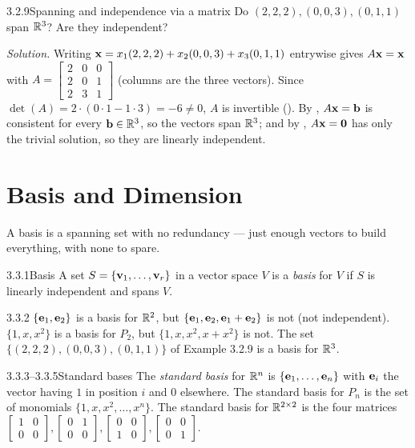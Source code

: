 \begin{exmp}{3.2.9}{Spanning and independence via a matrix}
Do $(2,2,2),(0,0,3),(0,1,1)$ span $\mathbb{R}^3$? Are they independent?

\smallskip
\noindent\textit{Solution.} Writing $\mathbf{x}=x_1(2,2,2)+x_2(0,0,3)+x_3(0,1,1)$ entrywise gives $A\mathbf{x}=\mathbf{x}$ with $A=\left[\begin{smallmatrix}2&0&0\\2&0&1\\2&3&1\end{smallmatrix}\right]$ (columns are the three vectors). Since $\det(A)=2\cdot(0\cdot1-1\cdot3)=-6\neq0$, $A$ is invertible (). By , $A\mathbf{x}=\mathbf{b}$ is consistent for every $\mathbf{b}\in\mathbb{R}^3$, so the vectors span $\mathbb{R}^3$; and by , $A\mathbf{x}=\mathbf{0}$ has only the trivial solution, so they are linearly independent.
\end{exmp}

\section{Basis and Dimension}
\label{sec:3.3}

A basis is a spanning set with no redundancy --- just enough vectors to build everything, with none to spare.

\begin{defns}{3.3.1}{Basis}
A set $S=\{\mathbf{v}_1,\dots,\mathbf{v}_r\}$ in a vector space $V$ is a \emph{basis} for $V$ if $S$ is linearly independent and spans $V$.
\end{defns}

\begin{exmp}{3.3.2}{}
$\{\mathbf{e}_1,\mathbf{e}_2\}$ is a basis for $\mathbb{R}^2$, but $\{\mathbf{e}_1,\mathbf{e}_2,\mathbf{e}_1+\mathbf{e}_2\}$ is not (not independent). $\{1,x,x^2\}$ is a basis for $P_2$, but $\{1,x,x^2,x+x^2\}$ is not. The set $\{(2,2,2),(0,0,3),(0,1,1)\}$ of Example 3.2.9 is a basis for $\mathbb{R}^3$.
\end{exmp}

\begin{exmp}{3.3.3--3.3.5}{Standard bases}
The \emph{standard basis} for $\mathbb{R}^n$ is $\{\mathbf{e}_1,\dots,\mathbf{e}_n\}$ with $\mathbf{e}_i$ the vector having $1$ in position $i$ and $0$ elsewhere. The standard basis for $P_n$ is the set of monomials $\{1,x,x^2,\dots,x^n\}$. The standard basis for $\mathbb{R}^{2\times2}$ is the four matrices $\left[\begin{smallmatrix}1&0\\0&0\end{smallmatrix}\right],\left[\begin{smallmatrix}0&1\\0&0\end{smallmatrix}\right],\left[\begin{smallmatrix}0&0\\1&0\end{smallmatrix}\right],\left[\begin{smallmatrix}0&0\\0&1\end{smallmatrix}\right]$.
\end{exmp}

